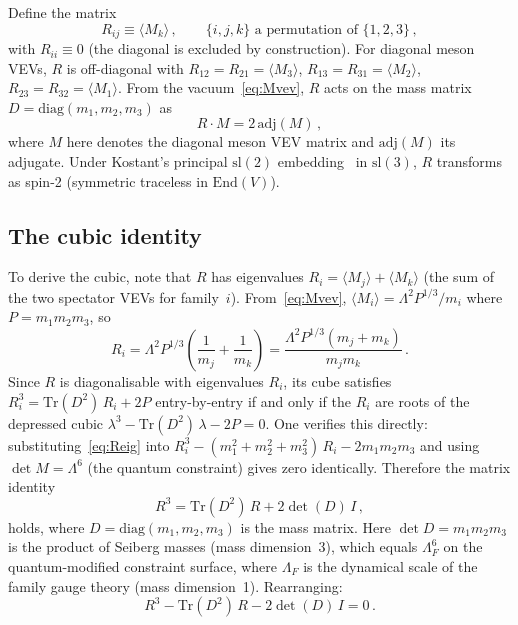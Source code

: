 \documentclass[aps,prd,twocolumn,showpacs,preprintnumbers,superscriptaddress,floatfix]{revtex4-2}
\newcommand{\Tr}{\mathrm{Tr}}
\newcommand{\adj}{\mathrm{adj}}
\newcommand{\diag}{\mathrm{diag}}
\begin{document}
Define the matrix
\begin{equation}
  R_{ij} \equiv \langle M_k\rangle\,,
  \qquad \{i,j,k\} \text{ a permutation of } \{1,2,3\}\,,
  \label{eq:Rdef}
\end{equation}
with $R_{ii} \equiv 0$ (the diagonal is excluded by construction).
For diagonal meson VEVs, $R$ is off-diagonal with
$R_{12} = R_{21} = \langle M_3\rangle$,
$R_{13} = R_{31} = \langle M_2\rangle$,
$R_{23} = R_{32} = \langle M_1\rangle$.
From the vacuum~\eqref{eq:Mvev}, $R$ acts on the mass matrix
$D = \diag(m_1, m_2, m_3)$ as
\begin{equation}
  R \cdot M = 2\,\adj(M)\,,
  \label{eq:RM}
\end{equation}
where $M$ here denotes the diagonal meson VEV matrix and
$\adj(M)$ its adjugate.
Under Kostant's principal $\mathrm{sl}(2)$
embedding~\cite{Kostant:1959} in $\mathrm{sl}(3)$, $R$ transforms
as spin-2 (symmetric traceless in $\mathrm{End}(V)$).

\subsection{The cubic identity}

To derive the cubic, note that $R$ has eigenvalues
$R_i = \langle M_j\rangle + \langle M_k\rangle$ (the sum of the
two spectator VEVs for family~$i$).
From~\eqref{eq:Mvev}, $\langle M_i\rangle = \Lambda^2 P^{1/3}/m_i$
where $P = m_1 m_2 m_3$, so
\begin{equation}
  R_i = \Lambda^2 P^{1/3}\!\left(\frac{1}{m_j} + \frac{1}{m_k}\right)
      = \frac{\Lambda^2 P^{1/3}(m_j + m_k)}{m_j m_k}\,.
  \label{eq:Reig}
\end{equation}
Since $R$ is diagonalisable with eigenvalues $R_i$, its cube
satisfies $R_i^3 = \Tr(D^2)\,R_i + 2P$ entry-by-entry if and
only if the $R_i$ are roots of the depressed cubic
$\lambda^3 - \Tr(D^2)\,\lambda - 2P = 0$.
One verifies this directly: substituting~\eqref{eq:Reig} into
$R_i^3 - (m_1^2+m_2^2+m_3^2)\,R_i - 2m_1 m_2 m_3$ and using
$\det M = \Lambda^6$ (the quantum constraint) gives zero
identically.
Therefore the matrix identity
\begin{equation}
  \boxed{R^3 = \Tr(D^2)\,R + 2\det(D)\,I\,,}
  \label{eq:cubic}
\end{equation}
holds, where $D = \diag(m_1, m_2, m_3)$ is the mass matrix.
Here $\det D = m_1 m_2 m_3$ is the product of Seiberg masses
(mass dimension~3), which equals $\Lambda_F^6$ on the
quantum-modified constraint surface, where $\Lambda_F$ is the
dynamical scale of the family gauge theory (mass dimension~1).
Rearranging:
\begin{equation}
  R^3 - \Tr(D^2)\,R - 2\det(D)\,I = 0\,.
  \label{eq:cubic_CH}
\end{equation}
\end{document}
